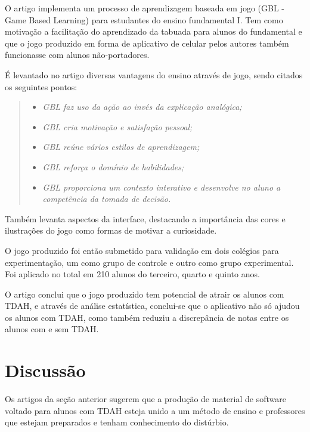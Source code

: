 O artigo\cite{sanchez} implementa um processo de aprendizagem baseada em jogo (GBL - Game Based Learning) para estudantes do ensino fundamental I. Tem como motivação a facilitação do aprendizado da tabuada para alunos do fundamental e que o jogo produzido em forma de aplicativo de celular pelos autores também funcionasse com alunos não-portadores.

É levantado no artigo diversas vantagens do ensino através de jogo, sendo citados os seguintes pontos:

\begin{quote}
\begin{itemize}
\item \textit{GBL faz uso da ação ao invés da explicação analógica;}
\item \textit{GBL cria motivação e satisfação pessoal;}
\item \textit{GBL reúne vários estilos de aprendizagem;}
\item \textit{GBL reforça o domínio de habilidades;}
\item \textit{GBL proporciona um contexto interativo e desenvolve no aluno a competência da tomada de decisão.}
\end{itemize}
\end{quote}

Também levanta aspectos da interface, destacando a importância das cores e ilustrações do jogo como formas de motivar a curiosidade. 

O jogo produzido foi então submetido para validação em dois colégios para experimentação, um como grupo de controle e outro como grupo experimental. Foi aplicado no total em 210 alunos do terceiro, quarto e quinto anos.

O artigo conclui que o jogo produzido tem potencial de atrair os alunos com TDAH, e através de análise estatística, conclui-se que o aplicativo não só ajudou os alunos com TDAH, como também reduziu a discrepância de notas entre os alunos com e sem TDAH.

\section{Discussão}

Os artigos da seção anterior sugerem que a produção de material de software voltado para alunos com TDAH esteja unido a um método de ensino e professores que estejam preparados e tenham conhecimento do distúrbio. 

